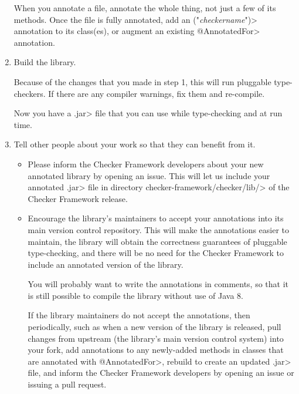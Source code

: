 \begin{enumerate}
  When you annotate a file, annotate the whole thing, not just a few of its
  methods.  Once the file is fully annotated, add an
  \<(\ttlcb"\emph{checkername}"\ttrcb)>
  annotation to its class(es), or augment an existing \<@AnnotatedFor>
  annotation.

\item
  Build the library.

  Because of the changes that you made in step 1, this will run pluggable
  type-checkers.  If there are any compiler warnings, fix them and re-compile.

  Now you have a \<.jar> file that you can use while type-checking and at
  run time.

\item
  Tell other people about your work so that they can benefit from it.

  \begin{itemize}
  \item
    Please inform the Checker Framework developers
    about your new annotated library by opening an issue.
    This will let us include your annotated \<.jar> file in directory
    \<checker-framework/checker/lib/> of the Checker Framework release.

  \item
    Encourage the library's maintainers to accept your annotations into its
    main version control repository.  This will make the annotations easier
    to maintain, the library will obtain the correctness guarantees of
    pluggable type-checking, and there will be no need for the Checker
    Framework to include an annotated version of the library.

    You will probably want to write the annotations in comments, so that it
    is still possible to compile the library without use of Java 8.

    If the library maintainers do not accept the annotations, then
    periodically, such as when a new version of the library is released,
    pull changes from upstream (the library's main version control system)
    into your fork, add annotations to any newly-added methods in classes
    that are annotated with \<@AnnotatedFor>, rebuild to create an updated
    \<.jar> file, and inform the Checker Framework developers by opening an
    issue or issuing a pull request.
  \end{itemize}

\end{enumerate}


